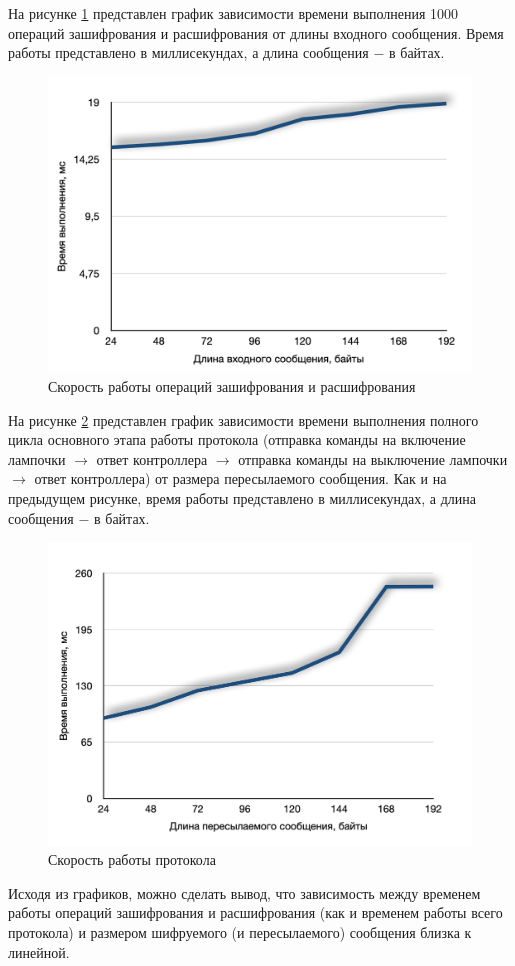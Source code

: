 	На рисунке \ref{fig4.10} представлен график зависимости времени выполнения 1000 операций
	зашифрования и расшифрования от длины входного сообщения. Время работы представлено
	в миллисекундах, а длина сообщения $-$ в байтах.
	
	\begin{figure}[h]
		\centering
		\includegraphics[scale=0.7]{resources/chart-1}
		\caption{Скорость работы операций зашифрования и расшифрования}
		\label{fig4.10}
	\end{figure}

	На рисунке \ref{fig4.11} представлен график зависимости времени выполнения полного цикла
	основного этапа работы протокола (отправка команды на включение лампочки $\rightarrow$
	ответ контроллера $\rightarrow$ отправка команды на выключение лампочки $\rightarrow$
	ответ контроллера) от размера пересылаемого сообщения. Как и на предыдущем рисунке,
	время работы представлено в миллисекундах, а длина сообщения $-$ в байтах.

	\begin{figure}[H]
		\centering
		\includegraphics[scale=0.7]{resources/chart-2}
		\caption{Скорость работы протокола}
		\label{fig4.11}
	\end{figure}

	Исходя из графиков, можно сделать вывод, что зависимость между временем работы операций зашифрования 
	и расшифрования (как и временем работы всего протокола) и размером шифруемого (и пересылаемого) 
	сообщения близка к линейной.
	
	